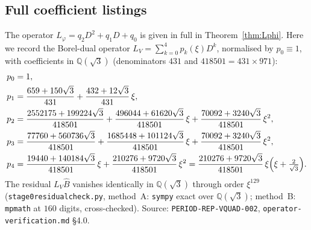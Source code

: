 \documentclass[11pt,reqno]{amsart}
\renewcommand{\_}{\vquadorigunderscore\allowbreak}
\theoremstyle{plain}
\theoremstyle{definition}
\newcommand{\Bhat}{\widehat{B}}
\newcommand{\Lphi}{L_{\varphi}}
\newcommand{\LV}{L_{V}}
\newcommand{\Qsqrt}{\mathbb{Q}(\sqrt3)}
\begin{document}
\subsection{Full coefficient listings}\label{app:coeffs}
The operator $\Lphi=q_2D^2+q_1D+q_0$ is given in full in Theorem~\ref{thm:Lphi}. Here we record
the Borel-dual operator $\LV=\sum_{k=0}^4 p_k(\xi)D^k$, normalised by $p_0\equiv1$, with
coefficients in $\Qsqrt$ (denominators $431$ and $418501=431\times971$):
\begin{align*}
  p_0&=1,\\
  p_1&=\frac{659+150\sqrt3}{431}+\frac{432+12\sqrt3}{431}\,\xi,\\
  p_2&=\frac{2552175+199224\sqrt3}{418501}
       +\frac{496044+61620\sqrt3}{418501}\,\xi
       +\frac{70092+3240\sqrt3}{418501}\,\xi^2,\\
  p_3&=\frac{77760+560736\sqrt3}{418501}
       +\frac{1685448+101124\sqrt3}{418501}\,\xi
       +\frac{70092+3240\sqrt3}{418501}\,\xi^2,\\
  p_4&=\frac{19440+140184\sqrt3}{418501}\,\xi
       +\frac{210276+9720\sqrt3}{418501}\,\xi^2
       =\frac{210276+9720\sqrt3}{418501}\,\xi\Bigl(\xi+\tfrac{2}{\sqrt3}\Bigr).
\end{align*}
The residual $\LV\Bhat$ vanishes identically in $\Qsqrt$ through order $\xi^{129}$
(\texttt{stage0\_residual\_check.py}, method~A: \texttt{sympy} exact over $\Qsqrt$; method~B:
\texttt{mpmath} at $160$ digits, cross-checked). Source: \texttt{PERIOD-REP-VQUAD-002},
\texttt{operator-verification.md} \S4.0.
\end{document}
